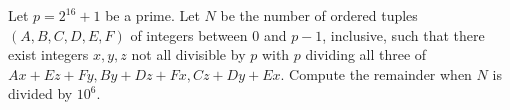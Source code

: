 Let $p=2^{16}+1$ be a prime. Let $N$ be the number of ordered tuples $(A,B,C,D,E,F)$ of integers between $0$ and $p-1$, inclusive, such that there exist integers $x,y,z$ not all divisible by $p$ with $p$ dividing all three of $Ax+Ez+Fy, By+Dz+Fx, Cz+Dy+Ex$. Compute the remainder when $N$ is divided by $10^6$.
